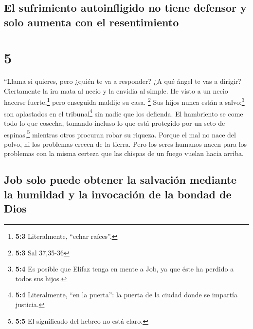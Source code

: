 \hypertarget{el-sufrimiento-autoinfligido-no-tiene-defensor-y-solo-aumenta-con-el-resentimiento}{%
\subsection{El sufrimiento autoinfligido no tiene defensor y solo
aumenta con el
resentimiento}\label{el-sufrimiento-autoinfligido-no-tiene-defensor-y-solo-aumenta-con-el-resentimiento}}

\hypertarget{section-4}{%
\section{5}\label{section-4}}

 ``Llama si quieres, pero ¿quién te va a responder? ¿A qué
ángel te vas a dirigir?  Ciertamente la ira mata al necio
y la envidia al simple.  He visto a un necio hacerse
fuerte,\footnote{\textbf{5:3} Literalmente, ``echar raíces''.} pero
enseguida maldije su casa. \footnote{\textbf{5:3} Sal 37,35-36}
 Sus hijos nunca están a salvo;\footnote{\textbf{5:4} Es
  posible que Elifaz tenga en mente a Job, ya que éste ha perdido a
  todos sus hijos.} son aplastados en el tribunal\footnote{\textbf{5:4}
  Literalmente, ``en la puerta'': la puerta de la ciudad donde se
  impartía justicia.} sin nadie que los defienda.  El
hambriento se come todo lo que cosecha, tomando incluso lo que está
protegido por un seto de espinas,\footnote{\textbf{5:5} El significado
  del hebreo no está claro.} mientras otros procuran robar su riqueza.
 Porque el mal no nace del polvo, ni los problemas crecen
de la tierra.  Pero los seres humanos nacen para los
problemas con la misma certeza que las chispas de un fuego vuelan hacia
arriba.

\hypertarget{job-solo-puede-obtener-la-salvaciuxf3n-mediante-la-humildad-y-la-invocaciuxf3n-de-la-bondad-de-dios}{%
\subsection{Job solo puede obtener la salvación mediante la humildad y
la invocación de la bondad de
Dios}\label{job-solo-puede-obtener-la-salvaciuxf3n-mediante-la-humildad-y-la-invocaciuxf3n-de-la-bondad-de-dios}}

